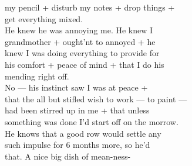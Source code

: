 \documentclass[11pt,a4paper]{article}
\begin{document}
{my pencil + disturb my notes + drop things + \\
get everything mixed. \\
\quad He knew he was annoying me. He knew I \\
 grandmother + ought'nt  to annoyed + he \\
knew I was doing everything to provide for \\
his comfort + peace of mind + that I do his \\
mending right off. \\
\quad No --- his instinct saw I was at peace + \\
that the all but stifled wish to work --- to paint --- \\
had been stirred up in me + that unless \\
something was done I'd start off on the morrow. \\
He knows that a good row would settle any \\
such impulse for 6 months more, so he'd \\
 that. A nice big dish of mean-ness-}




\end{document}
